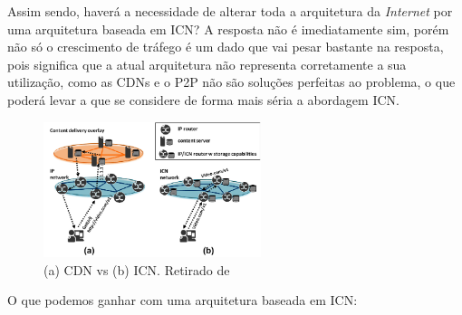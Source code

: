 \documentclass[conference]{IEEEtran}
\begin{document}
Assim sendo, haver\'{a} a necessidade de alterar toda a arquitetura da \textit{Internet} por uma arquitetura baseada em ICN? A resposta n\~{a}o \'{e} imediatamente sim, por\'{e}m n\~{a}o s\'{o} o crescimento de tr\'{a}fego \'{e} um dado que vai pesar bastante na resposta, pois significa que a atual arquitetura n\~{a}o representa corretamente a sua utiliza\c{c}\~{a}o, como as CDNs e o P2P n\~{a}o s\~{a}o solu\c{c}\~{o}es perfeitas ao problema, o que poder\'{a} levar a que se considere de forma mais s\'{e}ria a abordagem ICN.\\ 


\begin{figure}[h]
\centering
\includegraphics[width=2.5in]{cdnvsicn}
\caption{(a) CDN vs (b) ICN. Retirado de \cite{cdnToICN}}
\label{cdnvsicn}
\end{figure}

O que podemos ganhar com uma arquitetura baseada em ICN\cite{ahlgren}:\\
\end{document}
